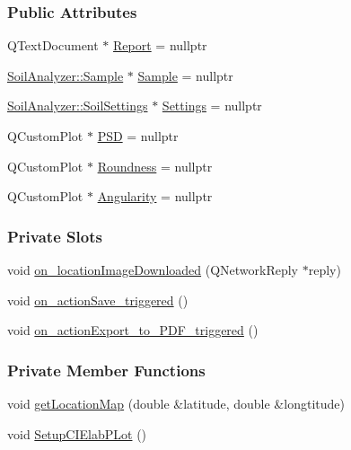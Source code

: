 \subsubsection*{Public Attributes}
\begin{DoxyCompactItemize}
\item 
Q\+Text\+Document $\ast$ \hyperlink{class_q_report_generator_ab051048608bc51151bc0b1ffc217f292}{Report} = nullptr
\item 
\hyperlink{class_soil_analyzer_1_1_sample}{Soil\+Analyzer\+::\+Sample} $\ast$ \hyperlink{class_q_report_generator_a779d8c539bb762daccaf61189cedcae5}{Sample} = nullptr
\item 
\hyperlink{class_soil_analyzer_1_1_soil_settings}{Soil\+Analyzer\+::\+Soil\+Settings} $\ast$ \hyperlink{class_q_report_generator_a5e75a3f9447c0c24b32cd198a00af21c}{Settings} = nullptr
\item 
Q\+Custom\+Plot $\ast$ \hyperlink{class_q_report_generator_a8363c2cf697c443a9d58b223efddde02}{P\+S\+D} = nullptr
\item 
Q\+Custom\+Plot $\ast$ \hyperlink{class_q_report_generator_ad0dd77389aea1b1fb2a58e363e5ff8a1}{Roundness} = nullptr
\item 
Q\+Custom\+Plot $\ast$ \hyperlink{class_q_report_generator_a8c2f9aee54d302f1330c6fd60d12bd13}{Angularity} = nullptr
\end{DoxyCompactItemize}
\subsubsection*{Private Slots}
\begin{DoxyCompactItemize}
\item 
void \hyperlink{class_q_report_generator_a15c7c37fe5a9f178ae29bc1484aeaad9}{on\+\_\+location\+Image\+Downloaded} (Q\+Network\+Reply $\ast$reply)
\item 
void \hyperlink{class_q_report_generator_a7f16a79d19c4ae53859febaae31950e7}{on\+\_\+action\+Save\+\_\+triggered} ()
\item 
void \hyperlink{class_q_report_generator_aa170226241deb861a964ac722c8e4564}{on\+\_\+action\+Export\+\_\+to\+\_\+\+P\+D\+F\+\_\+triggered} ()
\end{DoxyCompactItemize}
\subsubsection*{Private Member Functions}
\begin{DoxyCompactItemize}
\item 
void \hyperlink{class_q_report_generator_ad588cf415e3d3a571fbd2fa7f9f30612}{get\+Location\+Map} (double \&latitude, double \&longtitude)
\item 
void \hyperlink{class_q_report_generator_a828ae557a03162a08d13f94f2d1888f4}{Setup\+C\+I\+Elab\+P\+Lot} ()
\end{DoxyCompactItemize}

